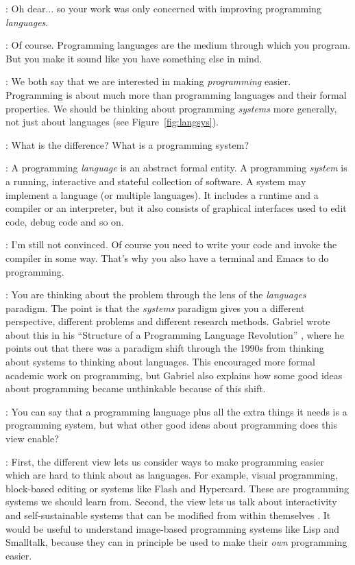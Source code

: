 \documentclass[runningheads]{llncs}
\newcommand{\T}{Tomas}
\newcommand{\J}{Joel}
\newcommand{\says}[2][gg]{\vspace{0.5em}\noindent\hangindent=0.5cm{\textsc{#1}}: #2}
\begin{document}
\says[\J]{Oh dear... so your work was only concerned with improving programming \emph{languages}.}

\says[\T]{Of course. Programming languages are the medium through which you program. But you make it sound like you have something else in mind.}

\says[\J]{We both say that we are interested in making \emph{programming} easier. Programming is about much more than programming languages and their formal properties. We should be thinking about programming \emph{systems} more generally, not just about languages (see Figure~\ref{fig:langsys}).}

\says[\T]{What is the difference? What is a programming system?}

\says[\J]{A programming \emph{language} is an abstract formal entity. A programming \emph{system} is a running, interactive and stateful collection of software. A system may implement a language (or multiple languages). It includes a runtime and a compiler or an interpreter, but it also consists of graphical interfaces used to edit code, debug code and so on.}

\says[\T]{I'm still not convinced. Of course you need to write your code and invoke the compiler in some way. That's why you also have a terminal and Emacs to do programming.}

\says[\J]{You are thinking about the problem through the lens of the \emph{languages} paradigm. The point is that the \emph{systems} paradigm gives you a different perspective, different problems and different research methods. Gabriel wrote about this in his ``Structure of a Programming Language Revolution'' \cite{rpg-2012-revolution}, where he points out that there was a paradigm shift through the 1990s from thinking about systems to thinking about languages. This encouraged more formal academic work on programming, but Gabriel also explains how some good ideas about programming became unthinkable because of this shift.}

\says[\T]{You can say that a programming language plus all the extra things it needs is a programming system, but what other good ideas about programming does this view enable?}

\says[\J]{First, the different view lets us consider ways to make programming easier which are hard to think about as languages. For example, visual programming, block-based editing \cite{resnick-2009-scratch} or systems like Flash \cite{ankerson-2018-dot} and Hypercard. These are programming systems we should learn from. Second, the view lets us talk about interactivity and self-sustainable systems that can be modified from within themselves \cite{hirschfeld-2008-s3,hirschfeld-2010-s3}. It would be useful to understand image-based programming systems like Lisp and Smalltalk, because they can in principle be used to make their \emph{own} programming easier.}
\end{document}
